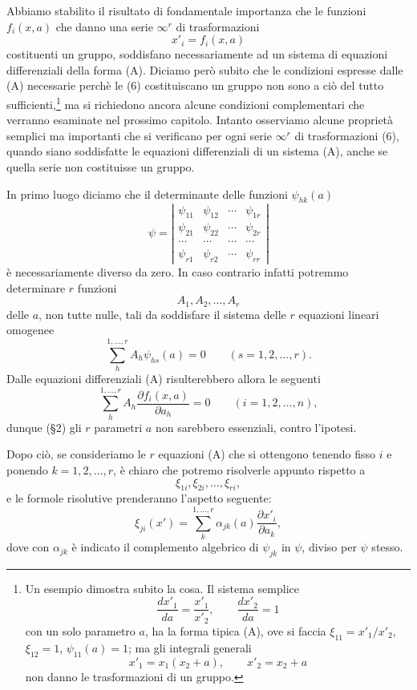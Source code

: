 \documentclass[11pt]{book}
\begin{document}
Abbiamo stabilito il risultato di fondamentale importanza che le funzioni $f_i(x,a)$ che danno una serie $\infty^r$ di trasformazioni
\begin{equation*}\tag{6}
 x'_i=f_i(x,a)
\end{equation*}
costituenti un gruppo, soddisfano necessariamente ad un sistema di equazioni differenziali della forma (A). Diciamo però subito che le condizioni espresse dalle (A) necessarie perchè le (6) costituiscano un gruppo non sono a ciò del tutto sufficienti,\footnote{Un esempio dimostra subito la cosa. Il sistema semplice
\[
 \frac{dx'_1}{da}=\frac{x'_1}{x'_2},\qquad \frac{dx'_2}{da}=1
\]
con un solo parametro $a$, ha la forma tipica (A), ove si faccia $\xi_{11}=x'_1/x'_2$, $\xi_{12}=1$, $\psi_{11}(a)=1$; ma gli integrali generali
\[
 x'_1=x_1(x_2+a),\qquad x'_2=x_2+a
\]
non danno le trasformazioni di un gruppo.} ma si richiedono ancora alcune condizioni complementari che verranno esaminate nel prossimo capitolo. Intanto osserviamo alcune proprietà semplici ma importanti che si verificano per ogni serie $\infty^r$ di trasformazioni (6), quando siano soddisfatte le equazioni differenziali di un sistema (A), anche se quella serie non costituisse un gruppo.

In primo luogo diciamo che il determinante delle funzioni $\psi_{hk}(a)$
\[
 \psi=\left|\begin{array}{cccc}
 \psi_{11}&\psi_{12}&\cdots&\psi_{1r}\\
 \psi_{21}&\psi_{22}&\cdots&\psi_{2r}\\
 \cdots&\cdots&\cdots&\cdots\\
 \psi_{r1}&\psi_{r2}&\cdots&\psi_{rr}
 \end{array}\right|
\]
è necessariamente diverso da zero. In caso contrario infatti potremmo determinare $r$ funzioni
\[
 A_1,A_2,\ldots,A_r
\]
delle $a$, non tutte nulle, tali da soddisfare il sistema delle $r$ equazioni lineari omogenee
\[
 \sum\limits_h^{1,\ldots,r} A_h\psi_{hs}(a)=0\qquad (s=1,2,\ldots,r).
\]
Dalle equazioni differenziali (A) risulterebbero allora le seguenti
\[
 \sum\limits_h^{1,\ldots,r} A_h\frac{\partial f_i(x,a)}{\partial a_h}=0\qquad (i=1,2,\ldots,n),
\]
dunque (\S{}2) gli $r$ parametri $a$ non sarebbero essenziali, contro l'ipotesi.

Dopo ciò, se consideriamo le $r$ equazioni (A) che si ottengono tenendo fisso $i$ e ponendo $k=1,2,\ldots,r$, è chiaro che potremo risolverle appunto rispetto a
\[
 \xi_{1i},\xi_{2i},\ldots,\xi_{ri},
\]
e le formole risolutive prenderanno l'aspetto seguente:
\begin{equation*}\tag{B}
 \xi_{ji}(x')=\sum\limits_k^{1,\ldots,r}\alpha_{jk}(a)\frac{\partial x'_i}{\partial a_k},
\end{equation*}
dove con $\alpha_{jk}$ è indicato il complemento algebrico di $\psi_{jk}$ in $\psi$, diviso per $\psi$ stesso.
\end{document}
